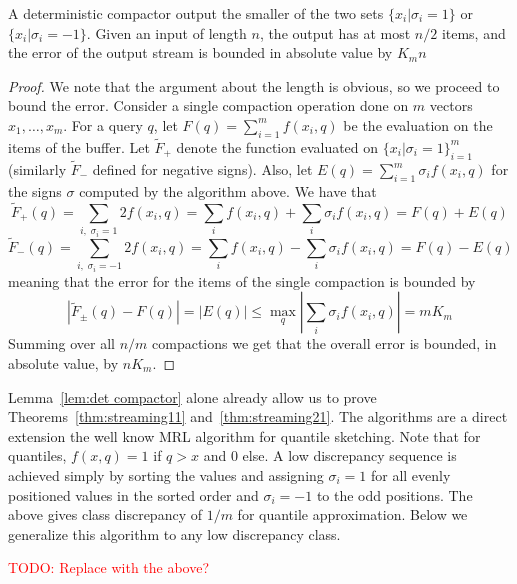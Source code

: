 \documentclass[anon,12pt]{colt2019} %
\newcommand{\todo}[1]{\textcolor{red}{TODO: #1}}
\begin{document}
\begin{lemma} \label{lem:det compactor}
A deterministic compactor output the smaller of the two sets  $\{ x_i | \sigma_i = 1\}$ or  $\{ x_i | \sigma_i = -1\}$. Given an input of length $n$, the output has at most $n/2$ items, and the error of the output stream is bounded in absolute value by $K_m n$
\end{lemma}
\begin{proof}
We note that the argument about the length is obvious, so we proceed to bound the error. Consider a single compaction operation done on $m$ vectors $x_1,\ldots,x_m$. For a query $q$, let $F(q)=\sum_{i=1}^m f(x_i,q)$ be the evaluation on the items of the buffer. Let $\tilde F_{+}$ denote the function evaluated on $\{ x_i | \sigma_i = 1\}_{i=1}^m$ (similarly $\tilde F_{-}$ defined for negative signs). Also, let $E(q) = \sum_{i=1}^m \sigma_i f(x_i,q)$ for the signs $\sigma$ computed by the algorithm above. We have that 
$$\tilde F_{+}(q) = \sum_{i ,\; \sigma_i=1} 2f(x_i, q) = \sum_{i} f(x_i, q) +  \sum_{i} \sigma_i f(x_i, q) = F(q) + E(q)$$
$$\tilde F_{-}(q) = \sum_{i ,\; \sigma_i=-1} 2f(x_i, q) = \sum_{i} f(x_i, q) - \sum_{i} \sigma_i f(x_i, q) = F(q) - E(q)$$
meaning that the error for the items of the single compaction is bounded by
$$|\tilde F_{\pm}(q) - F(q)| = |E(q)| \le \max_q |\sum_i \sigma_i f(x_i,q)| = mK_m$$
Summing over all $n/m$ compactions we get that the overall error is bounded, in absolute value, by $nK_m$.
\end{proof}

Lemma~\ref{lem:det compactor} alone already allow us to prove Theorems~\ref{thm:streaming11} and~\ref{thm:streaming21}. 
The algorithms are a direct extension the well know MRL algorithm \cite{MRL} for quantile sketching. 
Note that for quantiles, $f(x,q) = 1$ if $q > x$ and $0$ else. 
A low discrepancy sequence is achieved simply by sorting the values and assigning $\sigma_i = 1$ for all evenly positioned values in the sorted order and $\sigma_i=-1$ to the odd positions. The above gives class discrepancy of $1/m$ for quantile approximation.
Below we generalize this algorithm to any low discrepancy class.

\todo{Replace with the above?}
\end{document}
